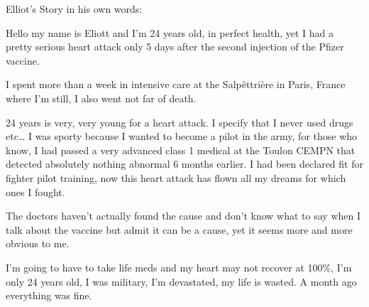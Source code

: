 Elliot’s Story in his own words:

Hello my name is Eliott and I’m 24 years old, in perfect health, yet I had a
pretty serious heart attack only 5 days after the second injection of the Pfizer
vaccine.

I spent more than a week in intensive care at the Salpêttrière in Paris, France
where I’m still, I also went not far of death.

24 years is very, very young for a heart attack. I specify that I never used
drugs etc… I was sporty because I wanted to become a pilot in the army, for
those who know, I had passed a very advanced class 1 medical at the Toulon CEMPN
that detected absolutely nothing abnormal 6 months earlier. I had been declared
fit for fighter pilot training, now this heart attack has flown all my dreams
for which ones I fought.

The doctors haven’t actually found the cause and don’t know what to say when I
talk about the vaccine but admit it can be a cause, yet it seems more and more
obvious to me.

I’m going to have to take life meds and my heart may not recover at 100\%, I’m
only 24 years old, I was military, I’m devastated, my life is wasted. A month
ago everything was fine.


